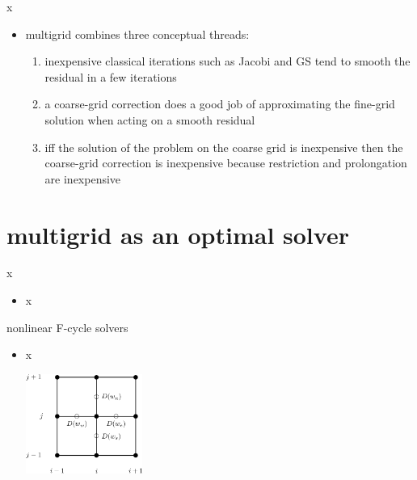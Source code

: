 \documentclass[10pt,
               svgnames,
               hyperref={colorlinks,citecolor=DeepPink4,linkcolor=FireBrick,urlcolor=Maroon},
               usepdftitle=false]{beamer}
\begin{document}
\begin{frame}{x}
\begin{itemize}
\item multigrid combines three conceptual threads:
\begin{enumerate}
\item inexpensive classical iterations such as Jacobi and GS tend to smooth the residual in a few iterations
\item a coarse-grid correction does a good job of approximating the fine-grid solution when acting on a smooth residual
\item iff the solution of the problem on the coarse grid is inexpensive then the coarse-grid correction is inexpensive because restriction and prolongation are inexpensive
\end{enumerate}
\end{itemize}
\end{frame}



\section{multigrid as an optimal solver}

\begin{frame}{x}
\begin{itemize}
\item x
\end{itemize}
\end{frame}

\begin{frame}{nonlinear F-cycle solvers}
\begin{itemize}
\item x

\hfill \includegraphics[width=0.3\textwidth]{images/msboxstencil.png}
\end{itemize}
\end{frame}
\end{document}
